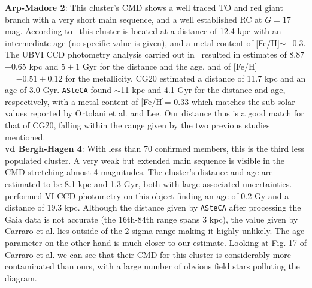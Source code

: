 \documentclass{aa}
\begin{document}
\begin{appendix}
  \noindent \textbf{Arp-Madore 2}: This cluster's CMD shows a well traced TO and
  red giant branch with a very short main sequence, and a
  well established RC at $G=17$ mag.
  According to~\cite{Ortolani_1995} this cluster is located at a distance of
  12.4 kpc with an intermediate age (no specific value is given), and a metal
  content of [Fe/H]$\sim-0.3$.
  The UBVI CCD photometry analysis carried out in~\cite{Lee_1997} resulted in
  estimates of 8.87$\pm$0.65 kpc and $5\pm1$ Gyr for the distance and the age,
  and of [Fe/H]$=-0.51\pm0.12$ for the metallicity.
  CG20 estimated a distance of 11.7 kpc and an age of 3.0 Gyr.
  \texttt{ASteCA} found $\sim$11 kpc and 4.1 Gyr for the distance and
  age, respectively, with a metal content of [Fe/H]=-0.33 which matches the
  sub-solar values reported by Ortolani et al. and Lee.
  Our distance thus is a good match for that of CG20, falling within the range
  given by the two previous studies mentioned.\\

  \noindent \textbf{vd Bergh-Hagen 4}: With less than 70 confirmed members, this is the
  third less populated cluster. A very weak but extended main sequence is
  visible in the CMD stretching almost 4 magnitudes.
  The cluster's distance and age are estimated to be 8.1 kpc and 1.3 Gyr,
  both with large associated uncertainties.
  \cite{Carraro_2007} performed VI CCD photometry on this object finding an
  age of 0.2 Gy and a distance of 19.3 kpc. Although the distance given by
  \texttt{ASteCA} after processing the Gaia data is not accurate (the 16th-84th
  range spans 3 kpc), the value given by Carraro et al. lies outside
  of the 2-sigma range making it highly unlikely. The age parameter on the other
  hand is much closer to our estimate.
  Looking at Fig. 17 of Carraro et al. we can see that their CMD for this
  cluster is considerably more contaminated than ours, with a large number of
  obvious field stars polluting the diagram.\\


\end{appendix}
\end{document}
